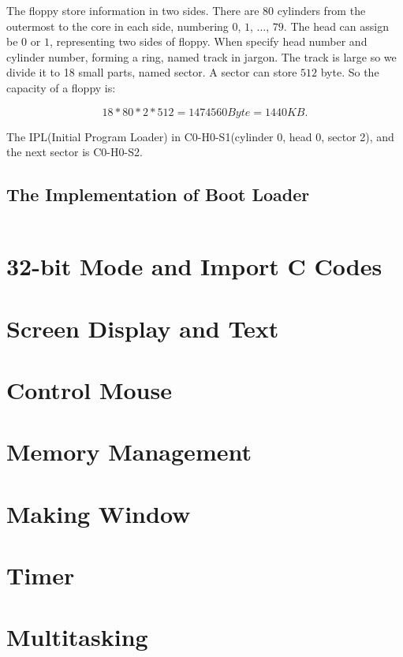 \documentclass{swfcthesis}
\begin{document}
The floppy store information in two sides. There are $80$ cylinders from the outermost to
the core in each side, numbering $0$, $1$, ..., $79$. The head can assign be $0$ or $1$,
representing two sides of floppy. When specify head number and cylinder number, forming a
ring, named track in jargon. The track is large so we divide it to 18 small parts, named
sector. A sector can store $512$ byte. So the capacity of a floppy is:

$$18 * 80 * 2 * 512 = 1474560 Byte = 1440 KB.$$

The IPL(Initial Program Loader) in C0-H0-S1(cylinder 0, head 0, sector 2), and the next
sector is C0-H0-S2.



\subsection{The Implementation of Boot Loader}
\label{sec:codes-comments}


\inputminted[linenos=true]{nasm}{./ipl10.nas}

\section{32-bit Mode and Import C Codes}


\section{Screen Display and Text}

\section{Control Mouse}


\section{Memory Management}

\section{Making Window }

\section{Timer}

\section{Multitasking}
\end{document}
